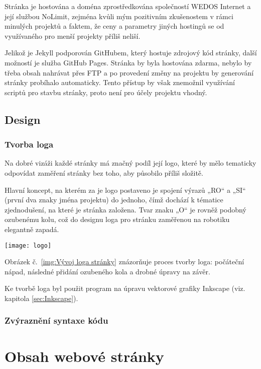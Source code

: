\documentclass[a4paper, 12pt]{article}
\begin{document}
  Stránka je hostována a doména zprostředkována společností WEDOS Internet a její službou NoLimit\cite{wedos-hosting}, zejména kvůli mým pozitivním zkušenostem v rámci minulých projektů a faktem, že ceny a parametry jiných hostingů se od využívaného pro menší projekty příliš neliší.

  Jelikož je Jekyll podporován GitHubem, který hostuje zdrojový kód stránky, další možností je služba GitHub Pages\cite{github-pages}. Stránka by byla hostována zdarma, nebylo by třeba obsah nahrávat přes FTP a po provedení změny na projektu by generování stránky probíhalo automaticky. Tento přístup by však znemožnil využívání scriptů pro stavbu stránky, proto není pro účely projektu vhodný.


  \subsection{Design}

  \subsubsection{Tvorba loga}
  Na dobré vizáži každé stránky má značný podíl její logo, které by mělo tematicky odpovídat zaměření stránky bez toho, aby působilo příliš složitě.

  Hlavní koncept, na kterém za je logo postaveno je spojení výrazů „RO“ a „SI“ (první dva znaky jména projektu) do jednoho, čímž dochází k tématice zjednodušení, na které je stránka založena. Tvar znaku „O“ je rovněž podobný ozubenému kolu, což do designu loga pro stránku zaměřenou na robotiku elegantně zapadá.

  \begin{center}
    \texttt{[image: logo]}
    \label{img:Vývoj loga stránky}
  \end{center}

  Obrázek č.~\ref{img:Vývoj loga stránky} znázorňuje proces tvorby loga: počáteční nápad, následné přidání ozubeného kola a drobné úpravy na závěr.

  Ke tvorbě loga byl použit program na úpravu vektorové grafiky Inkscape (viz. kapitola \ref{sec:Inkscape}).


  \subsubsection{Zvýraznění syntaxe kódu}

  \section{Obsah webové stránky}
\end{document}
